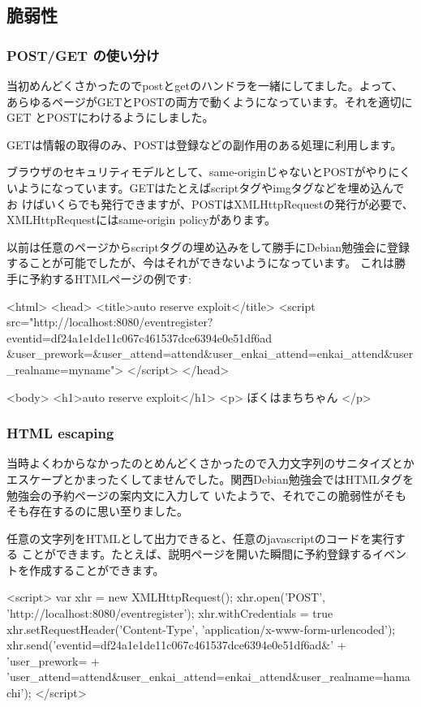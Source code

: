 \documentclass[mingoth,a4paper]{jsarticle}
\begin{document}
\subsection{脆弱性}

\subsubsection{POST/GET の使い分け}

当初めんどくさかったのでpostとgetのハンドラを一緒にしてました。よって、
あらゆるページがGETとPOSTの両方で動くようになっています。それを適切にGET
とPOSTにわけるようにしました。

GETは情報の取得のみ、POSTは登録などの副作用のある処理に利用します。

ブラウザのセキュリティモデルとして、same-originじゃないとPOSTがやりにく
いようになっています。GETはたとえばscriptタグやimgタグなどを埋め込んでお
けばいくらでも発行できますが、POSTはXMLHttpRequestの発行が必要で、
XMLHttpRequestにはsame-origin policyがあります。

以前は任意のページからscriptタグの埋め込みをして勝手にDebian勉強会に登録
することが可能でしたが、今はそれができないようになっています。
これは勝手に予約するHTMLページの例です:
\begin{commandline}
<html>
  <head>
    <title>auto reserve exploit</title>
    <script
 src="http://localhost:8080/eventregister?eventid=df24a1e1de11c067c461537dce6394e0e51df6ad
&user_prework=&user_attend=attend&user_enkai_attend=enkai_attend&user_realname=myname">
    </script>
  </head>

  <body>
    <h1>auto reserve exploit</h1>
    <p>
      ぼくはまちちゃん
    </p>
\end{commandline}

\subsubsection{HTML escaping}

当時よくわからなかったのとめんどくさかったので入力文字列のサニタイズとかエスケープとかまったくしてませんでした。関西Debian勉強会ではHTMLタグを勉強会の予約ページの案内文に入力して
いたようで、それでこの脆弱性がそもそも存在するのに思い至りました。

任意の文字列をHTMLとして出力できると、任意のjavascriptのコードを実行する
ことができます。たとえば、説明ページを開いた瞬間に予約登録するイベントを作成することができます。

\begin{commandline}
<script>
var xhr = new XMLHttpRequest();
xhr.open('POST', 'http://localhost:8080/eventregister');
xhr.withCredentials = true
xhr.setRequestHeader('Content-Type', 'application/x-www-form-urlencoded');
xhr.send('eventid=df24a1e1de11c067c461537dce6394e0e51df6ad&'
+ 'user_prework=%
+ 'user_attend=attend&user_enkai_attend=enkai_attend&user_realname=hamachi');
</script>
\end{commandline}
\end{document}
